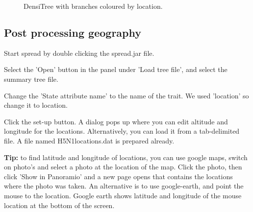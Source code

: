 \documentclass{article}
\begin{document}
\begin{figure}
\begin{center}
\end{center}
\caption{\label{fig.DensiTree2} DensiTree with branches coloured by location.}
\end{figure}

\subsection*{Post processing geography}

Start spread by double clicking the spread.jar file.

Select the 'Open' button in the panel under 'Load tree file', and select the summary tree file.

Change the 'State attribute name' to the name of the trait. We used 'location' so change it to location.

Click the set-up button. A dialog pops up where you can edit altitude and longitude for the locations. 
Alternatively, you can load it from a tab-delimited file. A file named H5N1locations.dat is prepared already.

{\bf Tip:} to find latitude and longitude of locations, you can 
use google maps, switch on photo's and select a photo at the location 
of the map. Click the photo, then click 'Show in Panoramio' and a 
new page opens that contains the locations where the photo was taken.
An alternative is to use google-earth, and point the mouse to the 
location. Google earth shows latitude and longitude of the mouse 
location at the bottom of the screen.
\end{document}
